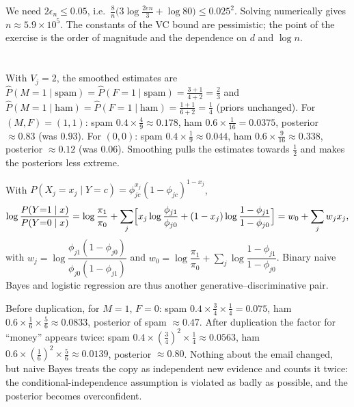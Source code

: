 We need $2\epsilon_n\leq0.05$, i.e.\
$\frac8n\bigl(3\log\frac{2en}{3} + \log80\bigr)\leq0.025^2$. Solving numerically
gives $n\approx5.9\times10^5$. The constants of the VC bound are pessimistic;
the point of the exercise is the order of magnitude and the dependence on $d$
and $\log n$.

\section{\nameref*{ch:generative-discriminative}}

With $V_j = 2$, the smoothed estimates are $\hat P(M{=}1\mid\text{spam}) =
\hat P(F{=}1\mid\text{spam}) = \frac{3+1}{4+2} = \frac23$ and
$\hat P(M{=}1\mid\text{ham}) = \hat P(F{=}1\mid\text{ham}) = \frac{1+1}{6+2} = \frac14$
(priors unchanged). For $(M,F) = (1,1)$: spam $0.4\times\frac49\approx0.178$, ham
$0.6\times\frac1{16} = 0.0375$, posterior $\approx0.83$ (was $0.93$). For
$(0,0)$: spam $0.4\times\frac19\approx0.044$, ham $0.6\times\frac9{16}\approx0.338$,
posterior $\approx0.12$ (was $0.06$). Smoothing pulls the estimates towards
$\frac12$ and makes the posteriors less extreme.

With $P(X_j = x_j\mid Y = c) = \phi_{jc}^{x_j}(1-\phi_{jc})^{1-x_j}$,
\[
  \log\frac{P(Y{=}1\mid x)}{P(Y{=}0\mid x)}
  = \log\frac{\pi_1}{\pi_0} + \sum_j\Bigl[x_j\log\frac{\phi_{j1}}{\phi_{j0}} + (1-x_j)\log\frac{1-\phi_{j1}}{1-\phi_{j0}}\Bigr]
  = w_0 + \sum_jw_jx_j,
\]
with $w_j = \log\dfrac{\phi_{j1}(1-\phi_{j0})}{\phi_{j0}(1-\phi_{j1})}$ and
$w_0 = \log\dfrac{\pi_1}{\pi_0} + \sum_j\log\dfrac{1-\phi_{j1}}{1-\phi_{j0}}$.
Binary naive Bayes and logistic regression are thus another
generative--discriminative pair.

Before duplication, for $M = 1$, $F = 0$: spam $0.4\times\frac34\times\frac14 = 0.075$,
ham $0.6\times\frac16\times\frac56\approx0.0833$, posterior of spam $\approx0.47$.
After duplication the factor for ``money'' appears twice: spam
$0.4\times(\frac34)^2\times\frac14\approx0.0563$, ham
$0.6\times(\frac16)^2\times\frac56\approx0.0139$, posterior $\approx0.80$.
Nothing about the email changed, but naive Bayes treats the copy as independent
new evidence and counts it twice: the conditional-independence assumption is
violated as badly as possible, and the posterior becomes overconfident.

